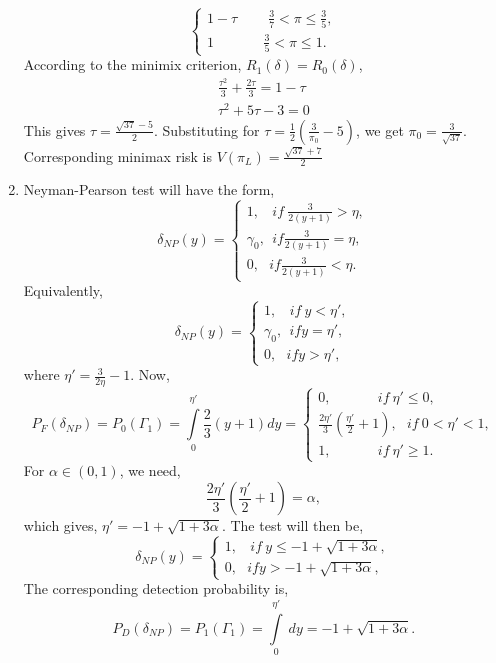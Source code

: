 \documentclass[a4paper,english,10pt]{article}
\begin{document}
\begin{enumerate}[label=(\alph*).]
\begin{equation*}
\begin{cases}
		1-\tau~~~~~~~~~~\frac{3}{7} < \pi \leq \frac{3}{5}, \\
		1~~~~~~~~~~~~~~~~\frac{3}{5} < \pi \leq 1.
	\end{cases}
\end{equation*}
According to the minimix criterion, $R_1(\delta)=R_0(\delta)$,
\begin{eqnarray*}
	\frac{\tau^2}{3}+\frac{2\tau}{3}=1-\tau	\\\nonumber
	\tau^2+5\tau-3=0
\end{eqnarray*}
This gives $\tau=\frac{\sqrt{37}-5}{2}$. Substituting for $\tau=\frac{1}{2}(\frac{3}{\pi_0}-5)$, we get $\pi_0=\frac{3}{\sqrt{37}}$. Corresponding minimax risk is $V(\pi_L)=\frac{\sqrt{37}+7}{2}$ 
\item Neyman-Pearson test will have the form,
\begin{equation*}
\delta_{NP}(y)=\begin{cases}
1,~~~~if~\frac{3}{2(y+1)}>\eta,\\
\gamma_0,~~if \frac{3}{2(y+1)}=\eta,\\
0,~~~if \frac{3}{2(y+1)}<\eta.
\end{cases}
\end{equation*}
Equivalently,
\begin{equation*}
\delta_{NP}(y)=\begin{cases}
1,~~~~if~y<\eta',\\
\gamma_0,~~if y=\eta',\\
0,~~~if y>\eta',
\end{cases}
\end{equation*}
where $\eta'=\frac{3}{2\eta}-1$. Now,
\begin{equation*}
P_F(\delta_{NP})=P_0(\Gamma_1)=\int\limits_{0}^{\eta'} \frac{2}{3}(y+1) dy=\begin{cases}
0,~~~~~~~~~~~~~~~if~\eta'\leq 0,\\
\frac{2\eta'}{3}(\frac{\eta'}{2}+1),~~~if~0 < \eta' <1,\\
1,~~~~~~~~~~~~~~~if~\eta'\geq 1.
\end{cases}
\end{equation*}
For $\alpha\in (0,1)$, we need,
\begin{equation*}
\frac{2\eta'}{3}(\frac{\eta'}{2}+1)=\alpha,
\end{equation*}
which gives, $\eta'=-1+\sqrt{1+3\alpha}$. The test will then be,
\begin{equation*}
\delta_{NP}(y)=\begin{cases}
1,~~~~if~y\leq -1+\sqrt{1+3\alpha},\\
0,~~~if y>-1+\sqrt{1+3\alpha},
\end{cases}
\end{equation*}
The corresponding detection probability is,
\begin{equation*}
P_D(\delta_{NP})=P_1(\Gamma_1)=\int\limits_{0}^{\eta'}~dy=-1+\sqrt{1+3\alpha}.
\end{equation*}
\end{enumerate}
\end{document}
